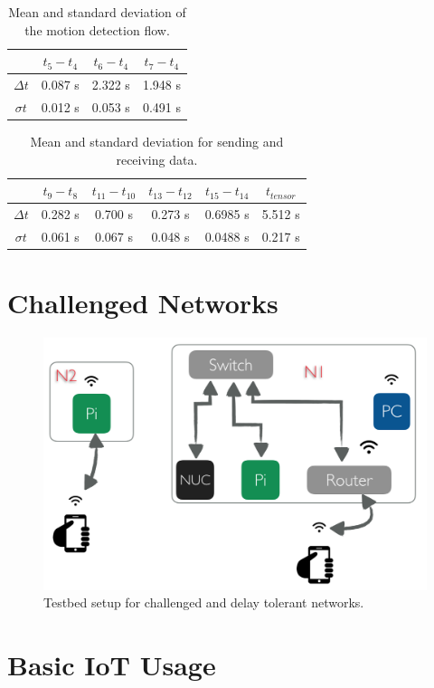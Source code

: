 \begin{table}[!ht]
\centering
\begin{tabular}{*{4}{c}}\toprule
&$t_5 - t_4$  & $t_6 - t_4$  & $t_7-t_4$ \\ \midrule
$\Delta t$ &0.087 s&2.322 s&1.948 s\\
$\sigma t$&0.012 s&0.053 s&0.491 s\\
\end{tabular}
\caption{Mean and standard deviation of the motion detection flow.}
\label{table:motion}
\end{table}

\begin{table}[!ht]
\centering
\begin{tabular}{*{6}{c}}	\toprule
&$t_9 - t_8$  & $t_{11} - t_{10}$  & $t_{13}-t_{12}$ & $t_{15}-t_{14}$&  $t_{tensor}$ \\ \midrule
$\Delta t$&0.282 s&0.700 s&	0.273 s&0.6985 s&5.512 s\\
$\sigma t$&0.061 s&0.067 s&	0.048 s&0.0488 s&0.217 s\\
	\end{tabular}
	\caption{Mean and standard deviation for sending and receiving data.}
	\label{table:data}
\end{table}


\section{Challenged Networks}
\begin{figure}[H]
	\centering
	\includegraphics[scale=0.6]{images/tb-dtn.png}
	\caption{Testbed setup for challenged and delay tolerant networks.}
	\label{fig:tb-dtn}
\end{figure} 

\section{Basic IoT Usage}



